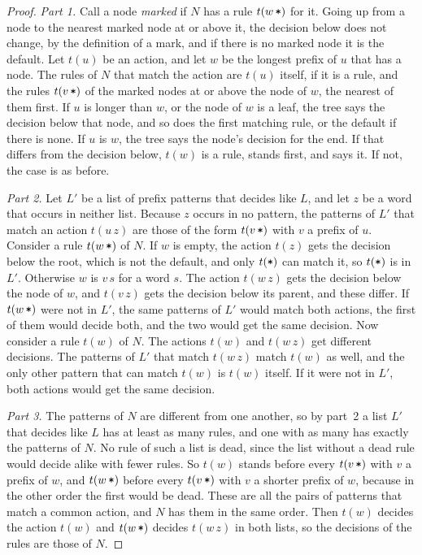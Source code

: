 \documentclass[acmsmall,nonacm,screen]{acmart}
\newcommand{\rest}{\textup{\texttt{*}}}
\begin{document}
\begin{proof}
\emph{Part 1.} Call a node \emph{marked} if $N$ has a rule $t(w\,\rest)$ for it. Going up
from a node to the nearest marked node at or above it, the decision below does not change, by
the definition of a mark, and if there is no marked node it is the default. Let $t(u)$ be an
action, and let $w$ be the longest prefix of $u$ that has a node. The rules of $N$ that match
the action are $t(u)$ itself, if it is a rule, and the rules $t(v\,\rest)$ of the marked
nodes at or above the node of $w$, the nearest of them first. If $u$ is longer than $w$, or
the node of $w$ is a leaf, the tree says the decision below that node, and so does the first
matching rule, or the default if there is none. If $u$ is $w$, the tree says the node's
decision for the end. If that differs from the decision below, $t(w)$ is a rule, stands
first, and says it. If not, the case is as before.

\emph{Part 2.} Let $L'$ be a list of prefix patterns that decides like $L$, and let $z$ be a
word that occurs in neither list. Because $z$ occurs in no pattern, the patterns of $L'$ that
match an action $t(u\,z)$ are those of the form $t(v\,\rest)$ with $v$ a prefix of $u$.
Consider a rule $t(w\,\rest)$ of $N$. If $w$ is empty, the action $t(z)$ gets the decision
below the root, which is not the default, and only $t(\rest)$ can match it, so $t(\rest)$ is
in $L'$. Otherwise $w$ is $v\,s$ for a word $s$. The action $t(w\,z)$ gets the decision below
the node of $w$, and $t(v\,z)$ gets the decision below its parent, and these differ. If
$t(w\,\rest)$ were not in $L'$, the same patterns of $L'$ would match both actions, the first
of them would decide both, and the two would get the same decision. Now consider a rule
$t(w)$ of $N$. The actions $t(w)$ and $t(w\,z)$ get different decisions. The patterns of $L'$
that match $t(w\,z)$ match $t(w)$ as well, and the only other pattern that can match $t(w)$
is $t(w)$ itself. If it were not in $L'$, both actions would get the same decision.

\emph{Part 3.} The patterns of $N$ are different from one another, so by part~2 a list $L'$
that decides like $L$ has at least as many rules, and one with as many has exactly the
patterns of $N$. No rule of such a list is dead, since the list without a dead rule would
decide alike with fewer rules. So $t(w)$ stands before every $t(v\,\rest)$ with $v$ a prefix
of $w$, and $t(w\,\rest)$ before every $t(v\,\rest)$ with $v$ a shorter prefix of $w$,
because in the other order the first would be dead. These are all the pairs of patterns that
match a common action, and $N$ has them in the same order. Then $t(w)$ decides the action
$t(w)$ and $t(w\,\rest)$ decides $t(w\,z)$ in both lists, so the decisions of the rules are
those of $N$.
\end{proof}
\end{document}
